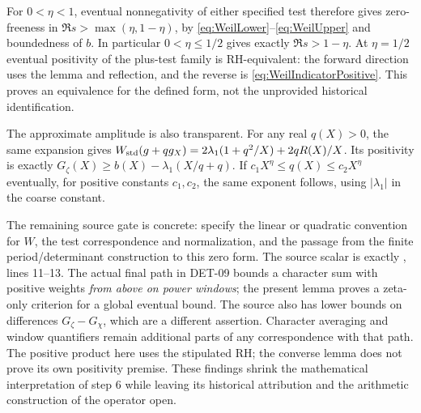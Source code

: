 \documentclass[11pt,a4paper]{article}
\newcommand{\fid}[1]{\textsf{#1}}
\begin{document}
For $0<\eta<1$, eventual nonnegativity of either specified test therefore gives zero-freeness in $\Re s>\max(\eta,1-\eta)$, by \eqref{eq:WeilLower}--\eqref{eq:WeilUpper} and boundedness of $b$. In particular $0<\eta\le1/2$ gives exactly $\Re s>1-\eta$. At $\eta=1/2$ eventual positivity of the plus-test family is RH-equivalent: the forward direction uses the lemma and reflection, and the reverse is \eqref{eq:WeilIndicatorPositive}. This proves an equivalence for the defined form, not the unprovided historical identification.

The approximate amplitude is also transparent. For any real $q(X)>0$, the same expansion gives
$W_{\rm std}(g+qg_X)=2\lambda_1(1+q^2/X)+2qR(X)/X$.
Its positivity is exactly $G_\zeta(X)\ge b(X)-\lambda_1(X/q+q)$.
If $c_1X^\eta\le q(X)\le c_2X^\eta$ eventually, for positive constants $c_1,c_2$, the same exponent follows, using $|\lambda_1|$ in the coarse constant.

The remaining source gate is concrete: specify the linear or quadratic convention for $W$, the test correspondence and normalization, and the passage from the finite period/determinant construction to this zero form. The source scalar is exactly , lines 11--13. The actual final path in \fid{DET-09} bounds a character sum with positive weights \emph{from above on power windows}; the present lemma proves a zeta-only criterion for a global eventual bound. The source also has lower bounds on differences $G_\zeta-G_\chi$, which are a different assertion. Character averaging and window quantifiers remain additional parts of any correspondence with that path. The positive product here uses the stipulated RH; the converse lemma does not prove its own positivity premise. These findings shrink the mathematical interpretation of step 6 while leaving its historical attribution and the arithmetic construction of the operator open.
\end{document}
